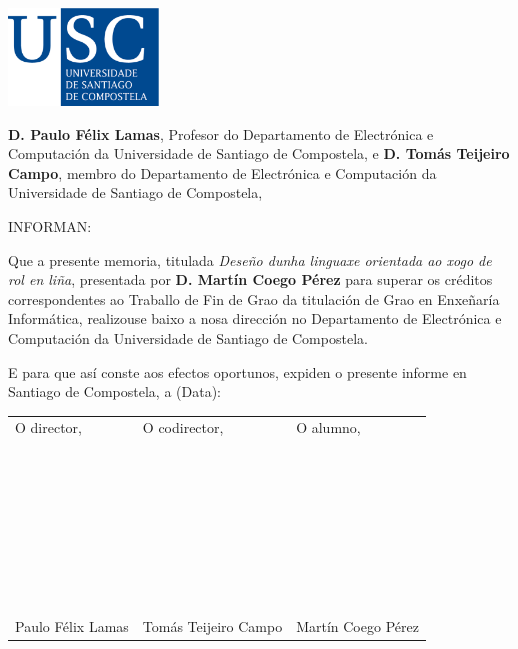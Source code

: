 \pagestyle{plain}
\includegraphics[width=4cm]{figuras/logo_usc.eps}

\vspace{1cm}
{\bf D. Paulo Félix Lamas}, Profesor do Departamento de Electrónica e
Computación da Universidade de Santiago de Compostela, e {\bf D. Tomás Teijeiro
Campo}, membro do Departamento de Electrónica e Computación da Universidade de
Santiago de Compostela,

\vspace{1cm}
INFORMAN:

\vspace{1cm}
Que a presente memoria, titulada {\it Deseño dunha linguaxe orientada ao xogo de
rol en liña}, presentada por {\bf D.
Martín Coego Pérez} para superar os créditos correspondentes ao
Traballo de Fin de Grao da titulación de Grao en Enxeñaría Informática,
realizouse baixo a nosa dirección no Departamento de Electrónica e Computación
da Universidade de Santiago de Compostela.

\vspace{1cm}
E para que así conste aos efectos oportunos, expiden o presente informe en
Santiago de Compostela, a (Data):

\vspace{2cm}
\begin{tabular}{lll}
O director, & O codirector, & O alumno, \\
~ \\
~ \\
~ \\
~ \\
~ \\
~ \\
~ \\
Paulo Félix Lamas & Tomás Teijeiro Campo & Martín Coego Pérez
\end{tabular}

